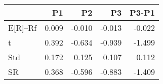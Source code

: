 \begin{tabular}{lrrrr}
\toprule
 & P1 & P2 & P3 & P3-P1 \\
\midrule
E[R]--Rf & 0.009 & -0.010 & -0.013 & -0.022 \\
t & 0.392 & -0.634 & -0.939 & -1.499 \\
Std & 0.172 & 0.125 & 0.107 & 0.112 \\
SR & 0.368 & -0.596 & -0.883 & -1.409 \\
\bottomrule
\end{tabular}
